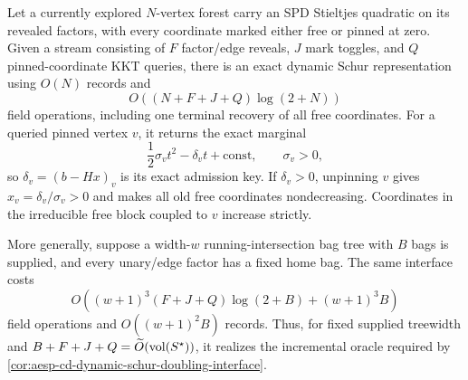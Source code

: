 \begin{proposition}
\label{prop:aesp-cd-dynamic-schur-forest}
Let a currently explored $N$-vertex forest carry an SPD Stieltjes quadratic
on its revealed factors, with every coordinate marked either free or pinned
at zero.  Given a stream consisting
of $F$ factor/edge reveals, $J$ mark toggles, and $Q$ pinned-coordinate KKT
queries, there is an exact dynamic Schur representation using $O(N)$ records
and
\begin{equation}
 O\!\left((N+F+J+Q)\log(2+N)\right)
 \label{eq:aesp-cd-dynamic-schur-forest-work}
\end{equation}
field operations, including one terminal recovery of all free coordinates.
For a queried pinned vertex $v$, it returns the exact marginal
\begin{equation*}
 \frac12\sigma_vt^2-\delta_vt+\mathrm{const},
 \qquad \sigma_v>0,
\end{equation*}
so $\delta_v=(b-Hx)_v$ is its exact admission key.  If $\delta_v>0$,
unpinning $v$ gives $x_v=\delta_v/\sigma_v>0$ and makes all old free
coordinates nondecreasing.  Coordinates in the irreducible free block
coupled to $v$ increase strictly.

More generally, suppose a width-$w$ running-intersection bag tree with $B$
bags is supplied, and every unary/edge factor has a fixed home bag.  The same
interface costs
\begin{equation}
 O\!\left((w+1)^3(F+J+Q)\log(2+B)+(w+1)^3B\right)
 \label{eq:aesp-cd-dynamic-schur-treewidth-work}
\end{equation}
field operations and $O((w+1)^2B)$ records.  Thus, for fixed supplied
treewidth and
$B+F+J+Q=\widetilde O(\operatorname{vol}(S^\star))$, it realizes the
incremental oracle required by
\cref{cor:aesp-cd-dynamic-schur-doubling-interface}.
\end{proposition}

